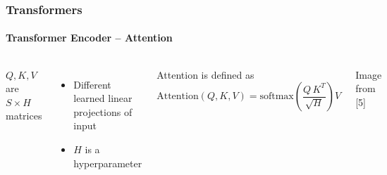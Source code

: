 \documentclass[xetex,professionalfont]{beamer}
\renewcommand\emph[1]{\textcolor{tuwcvl_cvl_blue}{#1}}
\begin{document}
\begin{frame}
	\frametitle{Transformers}
	\framesubtitle{Transformer Encoder -- Attention}


	\begin{columns}

		$Q,K,V$ are $S\times H$ matrices
		\begin{itemize}
			\item Different learned linear projections of input
			\item $H$ is a hyperparameter
		\end{itemize}

		\bigskip

		\emph{Attention} is defined as
		\[
			\text{Attention}(Q,K,V)=\text{softmax}\left(\frac{Q\,K^T}{\sqrt{H}}\right)V %
		\]


		\begin{center}
			{\centering Image from [5]}
		\end{center}

	\end{columns}

\end{frame}
\end{document}
